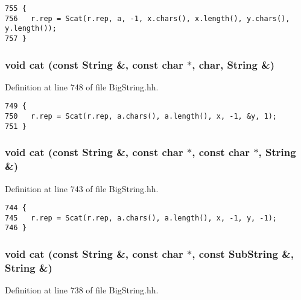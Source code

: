 \footnotesize\begin{verbatim}755 {
756   r.rep = Scat(r.rep, a, -1, x.chars(), x.length(), y.chars(), y.length());
757 }
\end{verbatim}\normalsize 
{}
\subsubsection{\setlength{\rightskip}{0pt plus 5cm}void cat (const String \&, const char $\ast$, char, String \&)\hspace{0.3cm}{\tt  [friend]}}\label{classString_l24}




Definition at line 748 of file Big\-String.hh.



\footnotesize\begin{verbatim}749 {
750   r.rep = Scat(r.rep, a.chars(), a.length(), x, -1, &y, 1);
751 }
\end{verbatim}\normalsize 
{}
\subsubsection{\setlength{\rightskip}{0pt plus 5cm}void cat (const String \&, const char $\ast$, const char $\ast$, String \&)\hspace{0.3cm}{\tt  [friend]}}\label{classString_l23}




Definition at line 743 of file Big\-String.hh.



\footnotesize\begin{verbatim}744 {
745   r.rep = Scat(r.rep, a.chars(), a.length(), x, -1, y, -1);
746 }
\end{verbatim}\normalsize 
{}
\subsubsection{\setlength{\rightskip}{0pt plus 5cm}void cat (const String \&, const char $\ast$, const {\bf Sub\-String} \&, String \&)\hspace{0.3cm}{\tt  [friend]}}\label{classString_l22}




Definition at line 738 of file Big\-String.hh.



